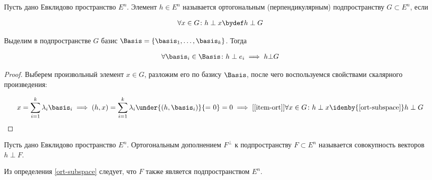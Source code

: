 
\begin{definition}\label{ort-subspace}
  Пусть дано Евклидово пространство \(E^{n}\).
  Элемент \(h \in E^{n}\) называется ортогональным (перпендикулярным)
  подпространству \(G \subset E^{n}\), если

  \begin{align*}
    \forall x \in G \colon h \perp x \bydef h \perp G
  \end{align*}
\end{definition}

\begin{corollary}\label{ort-subspace-by-basis}
  Выделим в подпространстве \(G\) базис
  \(\Basis = \{\basis_{1}, \dotsc, \basis_{k} \}\). Тогда

  \begin{align*}
    \forall \basis_{i} \in \Basis \colon h \perp e_{i}
    \implies h \bot G
  \end{align*}
\end{corollary}
\begin{proof}
  Выберем произвольный элемент \(x \in G\), разложим его по базису \(\Basis\),
  после чего воспользуемся свойствами скалярного произведения:

  \begin{align*}
    x = \sum_{i = 1}^{k} \lambda_{i} \basis_{i}
    \implies
    (h, x)
    = \sum_{i = 1}^{k} \lambda_{i} \under{(h, \basis_{i})}{\text{= 0}}
    = 0 
    \implies[\ref{item-ort}] \forall x \in G \colon h \perp x
    \idenby{\ref{ort-subspace}} h \perp G
  \end{align*}
\end{proof}

\begin{definition}\label{ort-compl}
  Пусть дано Евклидово пространство \(E^{n}\).
  Ортогональным дополнением \(F^{\perp}\) к подпространству
  \(F \subset E^{n}\) называется совокупность векторов \(h \perp F\).
\end{definition}

\begin{remark}
  Из определения \ref{ort-subspace} следует, что \(F\) также является
  подпространством \(E^{n}\).
\end{remark}


